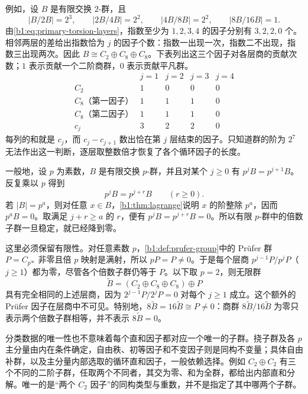 例如，设 \(B\) 是有限交换 \(2\)-群，且
\[
	|B/2B|=2^3,\qquad |2B/4B|=2^2,\qquad |4B/8B|=2^2,\qquad |8B/16B|=1.
\]
由\eqref{b1:eq:primary-torsion-layers}，指数至少为 \(1,2,3,4\) 的因子分别有 \(3,2,2,0\) 个。相邻两层的差给出指数恰为 \(j\) 的因子个数：指数一出现一次，指数二不出现，指数三出现两次。因此 \(B\cong C_2\oplus C_8\oplus C_8\)。下表列出这三个因子对各层商的贡献次数；\(1\) 表示贡献一个二阶商群，\(0\) 表示贡献平凡群。
\[
	\begin{array}{c|cccc}
		& j=1 & j=2 & j=3 & j=4\\ \hline C_2 & 1 & 0 & 0 & 0\\
		C_8\text{（第一因子）} & 1 & 1 & 1 & 0\\
		C_8\text{（第二因子）} & 1 & 1 & 1 & 0\\ \hline c_j & 3 & 2 & 2 & 0
	\end{array}
\]
每列的和就是 \(c_j\)，而 \(c_j-c_{j+1}\) 数出恰在第 \(j\) 层结束的因子。只知道群的阶为 \(2^7\) 无法作出这一判断，逐层取整数倍才恢复了各个循环因子的长度。

\ProseParagraphBreak
一般地，设 \(p\) 为素数，\(B\) 是有限交换 \(p\)-群，并且对某个 \(j\ge0\) 有 \(p^jB=p^{j+1}B\)。反复乘以 \(p\) 得到
\[
	p^jB=p^{j+r}B\qquad(r\ge0).
\]
若 \(|B|=p^a\)，则对任意 \(x\in B\)，\cref{b1:thm:lagrange}说明 \(x\) 的阶整除 \(p^a\)，因而 \(p^aB=0\)。取满足 \(j+r\ge a\) 的 \(r\)，便有 \(p^jB=p^{j+r}B=0\)。所以有限 \(p\)-群中的倍数子群一旦稳定，就已经降到零。

\ProseParagraphBreak
这里必须保留有限性。对任意素数 \(p\)，\cref{b1:def:prufer-group}中的 Prüfer 群 \(P=C_{p^\infty}\) 非零且倍 \(p\) 映射是满射，所以 \(pP=P\ne0\)。于是每个层商 \(p^{j-1}P/p^jP\)（\(j\ge1\)）都为零，尽管各个倍数子群仍等于 \(P\)。以下取 \(p=2\)，则无限群
\[
	\widetilde B=(C_2\oplus C_8\oplus C_8)\oplus P
\]
具有完全相同的上述层商，因为 \(2^{j-1}P/2^jP=0\) 对每个 \(j\ge1\) 成立。这个额外的 Prüfer 因子在层商中不可见。特别地，\(8\widetilde B=16\widetilde B\cong P\ne0\)：商群 \(8\widetilde B/16\widetilde B\) 为零只表示两个倍数子群相等，并不表示 \(8\widetilde B=0\)。

\ProseParagraphBreak
分类数据的唯一性也不意味着每个直和因子都对应一个唯一的子群。挠子群及各 \(p\) 主分量由内在条件确定，自由秩、初等因子和不变因子则是同构不变量；具体自由补群，以及主分量内部选取的循环直和因子，一般依赖选择。例如 \(C_2\oplus C_2\) 有三个不同的二阶子群，任取两个不同者，其交为零、和为全群，都给出内部直和分解。唯一的是“两个 \(C_2\) 因子”的同构类型与重数，并不是指定了其中哪两个子群。

